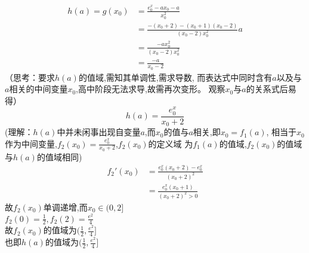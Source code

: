 \documentclass[UTF8]{ctexart}
\begin{document}
\[\begin{aligned}
        h(a)=g(x_0)&=\frac{e^x_0-ax_0-a}{x_0^2} \\
        &=\frac{-(x_0+2)-(x_0+1)(x_0-2)}{(x_0-2)x_0^2}a\\ 
        &=\frac{-ax_0^2}{(x_0-2)x_0^2}  \\
        &=\frac{-a}{x_0-2}  
\end{aligned}\]
（思考：要求$h(a)$的值域,需知其单调性,需求导数,
而表达式中同时含有$a$以及与$a$相关的中间变量$x_0$,高中阶段无法求导,故需再次变形。
观察$x_0$与$a$的关系式后易得）
\[h(a)=\frac{e^x_0}{x_0+2}\]
(理解：$h(a)$中并未闲事出现自变量$a$,而$x_0$的值与$a$相关,即$x_0=f_1(a)$,
相当于$x_0$作为中间变量,$f_2(x_0)=\frac{e^x_0}{x_0+2}$,$f_2(x_0)$的定义域
为$f_1(a)$的值域,$f_2(x_0)$的值域与$h(a)$的值域相同)
\[\begin{aligned}
    f_2'(x_0)&=\frac{e^x_0(x_0+2)-e^x_0}{(x_0+2)^2}\\
    &=\frac{e^x_0(x_0+1)}{(x_0+2)^2>0}
    \end{aligned} \]
故$f_2(x_0)$单调递增,而$x_0 \in (0,2]$\\
$f_2(0)=\frac{1}{2},f_2(2)=\frac{e^2}{4}$\\
故$f_2(x_0)$的值域为$(\frac{1}{2},\frac{e^2}{4}]$\\
也即$h(a)$的值域为$(\frac{1}{2},\frac{e^2}{4}]$
\end{document}
